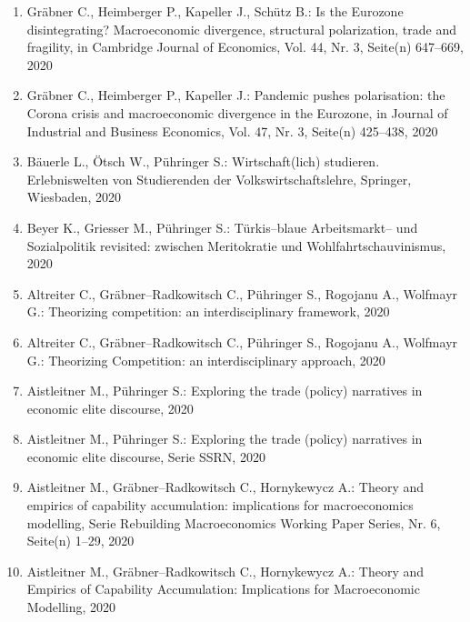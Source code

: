 \begin{enumerate}
	 \item Gräbner C., Heimberger P., Kapeller J., Schütz B.: Is the Eurozone disintegrating? Macroeconomic divergence, structural polarization, trade and fragility, in Cambridge Journal of Economics, Vol. 44, Nr. 3, Seite(n) 647--669, 2020
	 \item Gräbner C., Heimberger P., Kapeller J.: Pandemic pushes polarisation: the Corona crisis and macroeconomic divergence in the Eurozone, in Journal of Industrial and Business Economics, Vol. 47, Nr. 3, Seite(n) 425--438, 2020
	 \item Bäuerle L., Ötsch W., Pühringer S.: Wirtschaft(lich) studieren. Erlebniswelten von Studierenden der Volkswirtschaftslehre, Springer, Wiesbaden, 2020
	 \item Beyer K., Griesser M., Pühringer S.: Türkis--blaue Arbeitsmarkt-- und Sozialpolitik revisited: zwischen Meritokratie und Wohlfahrtschauvinismus, 2020
	 \item Altreiter C., Gräbner--Radkowitsch C., Pühringer S., Rogojanu A., Wolfmayr G.: Theorizing competition: an interdisciplinary framework, 2020
	 \item Altreiter C., Gräbner--Radkowitsch C., Pühringer S., Rogojanu A., Wolfmayr G.: Theorizing Competition: an interdisciplinary approach, 2020
	 \item Aistleitner M., Pühringer S.: Exploring the trade (policy) narratives in economic elite discourse, 2020
	 \item Aistleitner M., Pühringer S.: Exploring the trade (policy) narratives in economic elite discourse, Serie SSRN, 2020
	 \item Aistleitner M., Gräbner--Radkowitsch C., Hornykewycz A.: Theory and empirics of capability accumulation: implications for macroeconomics modelling, Serie Rebuilding Macroeconomics Working Paper Series, Nr. 6, Seite(n) 1--29, 2020
	 \item Aistleitner M., Gräbner--Radkowitsch C., Hornykewycz A.: Theory and Empirics of Capability Accumulation: Implications for Macroeconomic Modelling, 2020
\end{enumerate}
